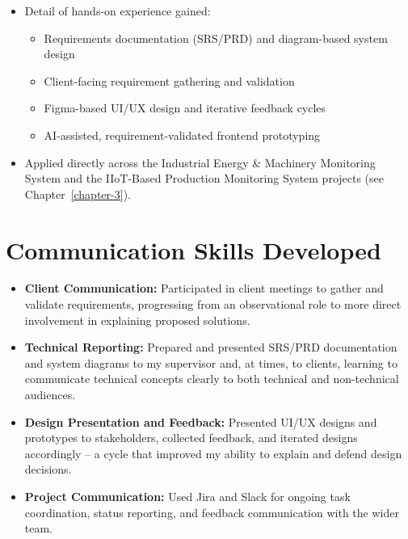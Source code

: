 \begin{itemize}
    \item Detail of hands-on experience gained:
    \begin{itemize}
        \item Requirements documentation (SRS/PRD) and diagram-based system design
        \item Client-facing requirement gathering and validation
        \item Figma-based UI/UX design and iterative feedback cycles
        \item AI-assisted, requirement-validated frontend prototyping
    \end{itemize}
    \item Applied directly across the Industrial Energy \& Machinery Monitoring System and the IIoT-Based Production Monitoring System projects (see Chapter~\ref{chapter-3}).
\end{itemize}

\section{Communication Skills Developed}
\begin{itemize}
    \item \textbf{Client Communication:} Participated in client meetings to gather and validate requirements, progressing from an observational role to more direct involvement in explaining proposed solutions.
    \item \textbf{Technical Reporting:} Prepared and presented SRS/PRD documentation and system diagrams to my supervisor and, at times, to clients, learning to communicate technical concepts clearly to both technical and non-technical audiences.
    \item \textbf{Design Presentation and Feedback:} Presented UI/UX designs and prototypes to stakeholders, collected feedback, and iterated designs accordingly -- a cycle that improved my ability to explain and defend design decisions.
    \item \textbf{Project Communication:} Used Jira and Slack for ongoing task coordination, status reporting, and feedback communication with the wider team.
\end{itemize}

